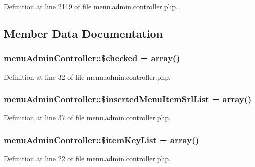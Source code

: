 Definition at line 2119 of file menu.\-admin.\-controller.\-php.



\subsection{Member Data Documentation}
\hypertarget{classmenuAdminController_a37ff2e21ee9beb6c2b762bb36b7e4d69}{
\subsubsection[{\$checked}]{\setlength{\rightskip}{0pt plus 5cm}menu\-Admin\-Controller\-::\$checked = array()}}\label{classmenuAdminController_a37ff2e21ee9beb6c2b762bb36b7e4d69}


Definition at line 32 of file menu.\-admin.\-controller.\-php.

\hypertarget{classmenuAdminController_a4b64a6e1711227dce12e508d4eb3c861}{
\subsubsection[{\$inserted\-Menu\-Item\-Srl\-List}]{\setlength{\rightskip}{0pt plus 5cm}menu\-Admin\-Controller\-::\$inserted\-Menu\-Item\-Srl\-List = array()}}\label{classmenuAdminController_a4b64a6e1711227dce12e508d4eb3c861}


Definition at line 37 of file menu.\-admin.\-controller.\-php.

\hypertarget{classmenuAdminController_a776db5a961d918ad97f1c6ce7b34fc07}{
\subsubsection[{\$item\-Key\-List}]{\setlength{\rightskip}{0pt plus 5cm}menu\-Admin\-Controller\-::\$item\-Key\-List = array()}}\label{classmenuAdminController_a776db5a961d918ad97f1c6ce7b34fc07}


Definition at line 22 of file menu.\-admin.\-controller.\-php.

